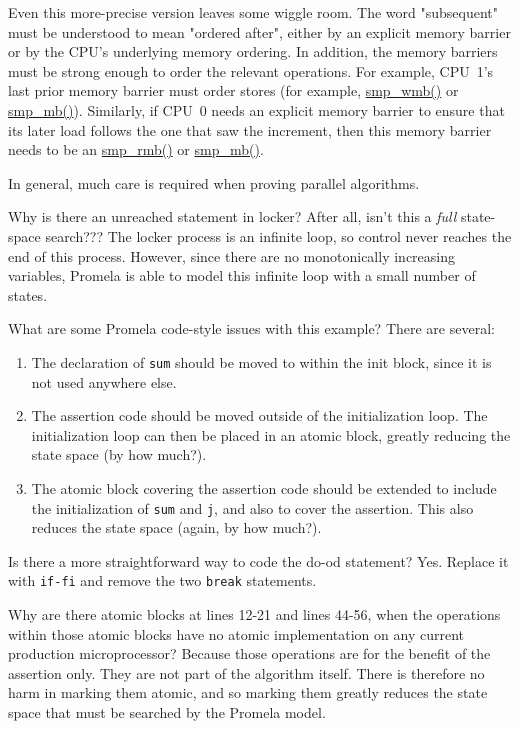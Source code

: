 	Even this more-precise version leaves some wiggle room.
	The word "subsequent" must be understood to mean "ordered after",
	either by an explicit memory barrier or by the CPU's underlying
	memory ordering.
	In addition, the memory barriers must be strong enough to order
	the relevant operations.
	For example, CPU~1's last prior memory barrier must order stores
	(for example, \url{smp_wmb()} or \url{smp_mb()}).
	Similarly, if CPU~0 needs an explicit memory barrier to
	ensure that its later load follows the one that saw the increment,
	then this memory barrier needs to be an \url{smp_rmb()}
	or \url{smp_mb()}.

	In general, much care is required when proving parallel algorithms.

\QuickQ{}
	Why is there an unreached statement in
	locker?  After all, isn't this a \emph{full} state-space
	search???
\QuickA{}
	The locker process is an infinite loop, so control
	never reaches the end of this process.
	However, since there are no monotonically increasing variables,
	Promela is able to model this infinite loop with a small
	number of states.

\QuickQ{}
	What are some Promela code-style issues with this example?
\QuickA{}
	There are several:
	\begin{enumerate}
	\item	The declaration of {\tt sum} should be moved to within
		the init block, since it is not used anywhere else.
	\item	The assertion code should be moved outside of the
		initialization loop.  The initialization loop can
		then be placed in an atomic block, greatly reducing
		the state space (by how much?).
	\item	The atomic block covering the assertion code should
		be extended to include the initialization of {\tt sum}
		and {\tt j}, and also to cover the assertion.
		This also reduces the state space (again, by how
		much?).
	\end{enumerate}

\QuickQ{}
	Is there a more straightforward way to code the do-od statement?
\QuickA{}
	Yes.
	Replace it with {\tt if-fi} and remove the two {\tt break} statements.

\QuickQ{}
	Why are there atomic blocks at lines 12-21
	and lines 44-56, when the operations within those atomic
	blocks have no atomic implementation on any current
	production microprocessor?
\QuickA{}
	Because those operations are for the benefit of the
	assertion only.  They are not part of the algorithm itself.
	There is therefore no harm in marking them atomic, and
	so marking them greatly reduces the state space that must
	be searched by the Promela model.

